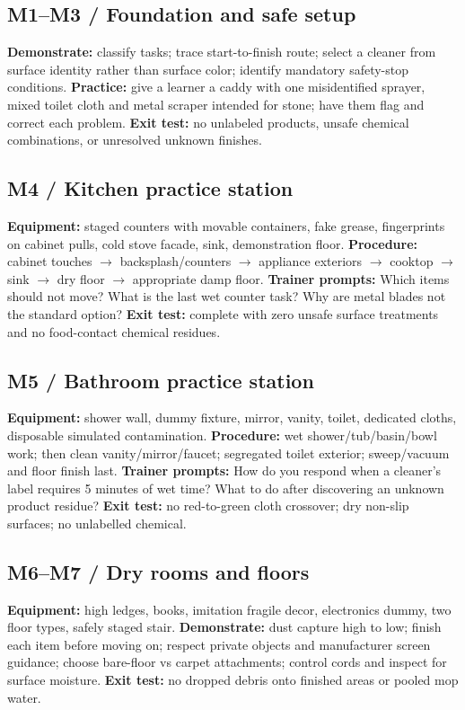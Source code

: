 \documentclass[10pt,letterpaper,oneside]{article}
\begin{document}
\subsection{M1--M3 / Foundation and safe setup}
\textbf{Demonstrate:} classify tasks; trace start-to-finish route; select a cleaner from surface identity rather than surface color; identify mandatory safety-stop conditions. \textbf{Practice:} give a learner a caddy with one misidentified sprayer, mixed toilet cloth and metal scraper intended for stone; have them flag and correct each problem. \textbf{Exit test:} no unlabeled products, unsafe chemical combinations, or unresolved unknown finishes.
\subsection{M4 / Kitchen practice station}
\textbf{Equipment:} staged counters with movable containers, fake grease, fingerprints on cabinet pulls, cold stove facade, sink, demonstration floor. \textbf{Procedure:} cabinet touches \(\rightarrow\) backsplash/counters \(\rightarrow\) appliance exteriors \(\rightarrow\) cooktop \(\rightarrow\) sink \(\rightarrow\) dry floor \(\rightarrow\) appropriate damp floor. \textbf{Trainer prompts:} Which items should not move? What is the last wet counter task? Why are metal blades not the standard option? \textbf{Exit test:} complete with zero unsafe surface treatments and no food-contact chemical residues.
\subsection{M5 / Bathroom practice station}
\textbf{Equipment:} shower wall, dummy fixture, mirror, vanity, toilet, dedicated cloths, disposable simulated contamination. \textbf{Procedure:} wet shower/tub/basin/bowl work; then clean vanity/mirror/faucet; segregated toilet exterior; sweep/vacuum and floor finish last. \textbf{Trainer prompts:} How do you respond when a cleaner's label requires 5 minutes of wet time? What to do after discovering an unknown product residue? \textbf{Exit test:} no red-to-green cloth crossover; dry non-slip surfaces; no unlabelled chemical.
\subsection{M6--M7 / Dry rooms and floors}
\textbf{Equipment:} high ledges, books, imitation fragile decor, electronics dummy, two floor types, safely staged stair. \textbf{Demonstrate:} dust capture high to low; finish each item before moving on; respect private objects and manufacturer screen guidance; choose bare-floor vs carpet attachments; control cords and inspect for surface moisture. \textbf{Exit test:} no dropped debris onto finished areas or pooled mop water.
\end{document}
